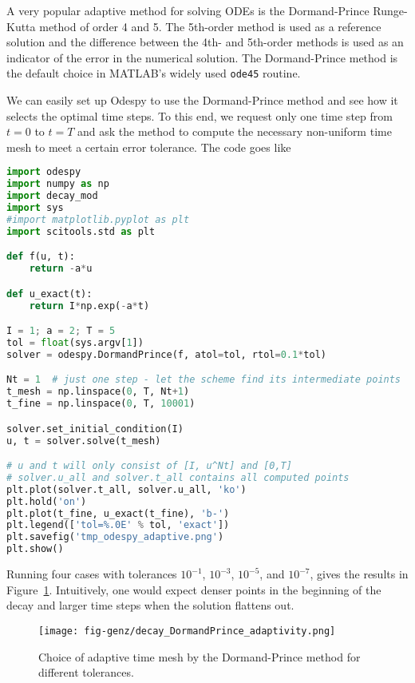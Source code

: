 \documentclass[graybox,sectrefs,envcountresetchap,open=right,final]{svmonodo}
\begin{document}
 

A very popular adaptive method for solving ODEs is the Dormand-Prince
Runge-Kutta method of order 4 and 5. The 5th-order method is used as a
reference solution and the difference between the 4th- and 5th-order
methods is used as an indicator of the error in the numerical
solution.  The Dormand-Prince method is the default choice in MATLAB's
widely used \texttt{ode45} routine.

We can easily set up Odespy to use the Dormand-Prince method and
see how it selects the optimal time steps. To this end, we request
only one time step from $t=0$ to $t=T$ and ask the method to
compute the necessary non-uniform time mesh to meet a certain
error tolerance. The code goes like

\begin{lstlisting}[language=Python,style=blue1bar_bluegreen]
import odespy
import numpy as np
import decay_mod
import sys
#import matplotlib.pyplot as plt
import scitools.std as plt

def f(u, t):
    return -a*u

def u_exact(t):
    return I*np.exp(-a*t)

I = 1; a = 2; T = 5
tol = float(sys.argv[1])
solver = odespy.DormandPrince(f, atol=tol, rtol=0.1*tol)

Nt = 1  # just one step - let the scheme find its intermediate points
t_mesh = np.linspace(0, T, Nt+1)
t_fine = np.linspace(0, T, 10001)

solver.set_initial_condition(I)
u, t = solver.solve(t_mesh)

# u and t will only consist of [I, u^Nt] and [0,T]
# solver.u_all and solver.t_all contains all computed points
plt.plot(solver.t_all, solver.u_all, 'ko')
plt.hold('on')
plt.plot(t_fine, u_exact(t_fine), 'b-')
plt.legend(['tol=%.0E' % tol, 'exact'])
plt.savefig('tmp_odespy_adaptive.png')
plt.show()
\end{lstlisting}

Running four cases with tolerances $10^{-1}$, $10^{-3}$, $10^{-5}$,
and $10^{-7}$, gives the results in Figure~\ref{decay:odespy:fig2}.
Intuitively, one would expect denser points in the beginning of
the decay and larger time steps when the solution flattens out.


\begin{figure}[!ht]  %
  \centerline{\texttt{[image: fig-genz/decay\_DormandPrince\_adaptivity.png]}}
  \caption{
  Choice of adaptive time mesh by the Dormand-Prince method for different tolerances. \label{decay:odespy:fig2}
  }
\end{figure}
\end{document}
